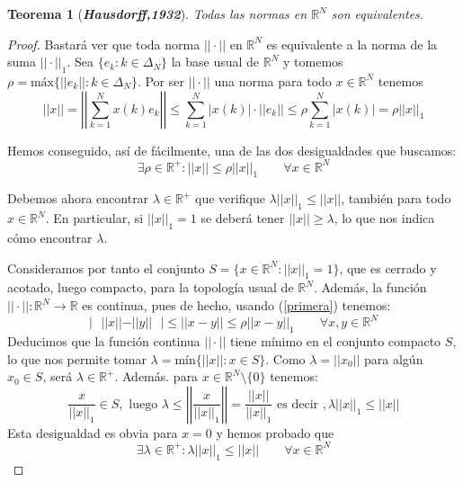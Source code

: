 \documentclass[a4paper, 12pt]{article}
\newtheorem{teorema}{Teorema}
\begin{document}
\begin{enumerate}[label=\textbf{\arabic*}.]
\begin{enumerate}[label=\textit{\alph*})]
			\begin{teorema}[\textbf{\textit{Hausdorff,1932}}]
			Todas las normas en \(\mathbb{R}^N\) son equivalentes.
			\end{teorema}
			
			\begin{proof}
			Bastará ver que toda norma \(|| \cdot ||\) en \(\mathbb{R}^N\) es equivalente a la norma de la suma \(||\cdot ||_1\). Sea \(\{e_k : k \in \Delta_N\}\) la base usual de \(\mathbb{R}^N\) y tomemos \(\rho = \text{máx} \{ ||e_k|| : k \in \Delta_N\}\). Por ser \(|| \cdot ||\) una norma para todo \(x \in \mathbb{R}^N\) tenemos
			\[
				||x|| = \left| \left| \sum_{k=1}^{N} x(k) e_k \right| \right| \leq \sum_{k=1}^{N} |x(k)| \cdot ||e_k|| \leq \rho \sum_{k=1}^{N} |x(k)| = \rho ||x||_1
			\]
			
			Hemos conseguido, así de fácilmente, una de las dos desigualdades que buscamos:
			\begin{equation}\label{primera}
				\exists \rho \in \mathbb{R}^+ : ||x|| \leq \rho ||x||_1 \qquad \forall x \in \mathbb{R}^N
			\end{equation}
			
			Debemos ahora encontrar \(\lambda \in \mathbb{R}^+\) que verifique \(\lambda ||x||_1 \leq ||x||\), también para todo \(x \in \mathbb{R}^N\). En particular, si \(||x||_1 =1\) se deberá tener \(||x|| \geq \lambda\), lo que nos indica cómo encontrar \(\lambda\).
			
			Consideramos por tanto el conjunto \(S = \{x \in \mathbb{R}^N : ||x||_1 = 1\}\), que es cerrado y acotado, luego compacto, para la topología usual de \(\mathbb{R}^N\). Además, la función \(||\cdot|| : \mathbb{R}^N \rightarrow \mathbb{R}\) es continua, pues de hecho, usando (\ref{primera}) tenemos:
			\[
				| \text{ }||x|| - ||y|| \text{ } | \leq ||x-y|| \leq \rho ||x - y ||_1 \qquad \forall x,y \in \mathbb{R}^N
			\]
			Deducimos que la función continua \(||\cdot||\) tiene mínimo en el conjunto compacto \(S\), lo que nos permite tomar \(\lambda = \text{mín}\{||x|| : x \in S\}\). Como \(\lambda = ||x_0||\) para algún \(x_0 \in S\), será \(\lambda \in \mathbb{R}^+\). Además. para \(x \in \mathbb{R}^N \setminus \{0\}\) tenemos:
			\[
				\frac{x}{||x||_1} \in S, \text{ luego } \lambda \leq \left| \left| \frac{x}{||x||_1} \right| \right| = \frac{||x||}{||x||_1} \text{ es decir }, \lambda ||x||_1 \leq ||x||
			\]
			Esta desigualdad es obvia para \(x = 0\) y hemos probado que 
			\begin{equation}\label{segunda}
				\exists \lambda \in \mathbb{R}^+ : \lambda ||x||_1 \leq ||x|| \qquad \forall x \in \mathbb{R}^N
			\end{equation}
			

\end{proof}
\end{enumerate}
\end{enumerate}
\end{document}

